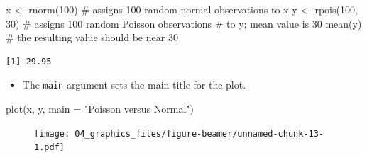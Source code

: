 \documentclass[
  9pt,
  a4paper,
  ignorenonframetext,
  notheorems]{beamer}
\newenvironment{Shaded}{\begin{snugshade}}{\end{snugshade}}
\newcommand{\AttributeTok}[1]{\textcolor[rgb]{0.40,0.45,0.13}{#1}}
\newcommand{\CommentTok}[1]{\textcolor[rgb]{0.37,0.37,0.37}{#1}}
\newcommand{\DecValTok}[1]{\textcolor[rgb]{0.68,0.00,0.00}{#1}}
\newcommand{\FunctionTok}[1]{\textcolor[rgb]{0.28,0.35,0.67}{#1}}
\newcommand{\NormalTok}[1]{\textcolor[rgb]{0.00,0.23,0.31}{#1}}
\newcommand{\OtherTok}[1]{\textcolor[rgb]{0.00,0.23,0.31}{#1}}
\newcommand{\StringTok}[1]{\textcolor[rgb]{0.13,0.47,0.30}{#1}}
\providecommand{\tightlist}{%
  \setlength{\itemsep}{0pt}\setlength{\parskip}{0pt}}\usepackage{longtable,booktabs,array}
\begin{document}
\begin{frame}[fragile]
\begin{Shaded}
\begin{Highlighting}[]
\NormalTok{x }\OtherTok{\textless{}{-}} \FunctionTok{rnorm}\NormalTok{(}\DecValTok{100}\NormalTok{) }\CommentTok{\# assigns 100 random normal observations to x }
\NormalTok{y }\OtherTok{\textless{}{-}} \FunctionTok{rpois}\NormalTok{(}\DecValTok{100}\NormalTok{, }\DecValTok{30}\NormalTok{) }\CommentTok{\# assigns 100 random Poisson observations}
                    \CommentTok{\# to y; mean value is 30}
\FunctionTok{mean}\NormalTok{(y) }\CommentTok{\# the resulting value should be near 30}
\end{Highlighting}
\end{Shaded}

\begin{verbatim}
[1] 29.95
\end{verbatim}

\begin{itemize}
\tightlist
\item
  The \texttt{main} argument sets the main title for the plot.
\end{itemize}

\begin{Shaded}
\begin{Highlighting}[]
\FunctionTok{plot}\NormalTok{(x, y, }\AttributeTok{main =} \StringTok{"Poisson versus Normal"}\NormalTok{)}
\end{Highlighting}
\end{Shaded}

\begin{figure}

{\centering \texttt{[image: 04\_graphics\_files/figure-beamer/unnamed-chunk-13-1.pdf]}

}

\end{figure}
\end{frame}
\end{document}

